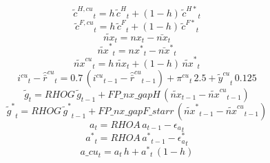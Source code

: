 \begin{dmath}
{{\tilde c^{H,cu}}}_{t}={{h}}\, {{\tilde c^H}}_{t}+\left(1-{{h}}\right)\, {{\tilde c^{H*}}}_{t}
\end{dmath}
\begin{dmath}
{{\tilde c^{F,cu}}}_{t}={{h}}\, {{\tilde c^F}}_{t}+\left(1-{{h}}\right)\, {{\tilde c^{F*}}}_{t}
\end{dmath}
\begin{dmath}
{{\tilde{nx}}}_{t}={{nx}}_{t}-{{\bar{nx}}}_{t}
\end{dmath}
\begin{dmath}
{{\tilde{nx}^*}}_{t}={{nx^*}}_{t}-{{\bar{nx}^*}}_{t}
\end{dmath}
\begin{dmath}
{{\tilde{nx}^{cu}}}_{t}={{h}}\, {{\tilde{nx}}}_{t}+\left(1-{{h}}\right)\, {{\tilde{nx}^*}}_{t}
\end{dmath}
\begin{dmath}
{{i^{cu}}}_{t}-{{\hat {\bar r}^{cu}}}_{t}=0.7\, \left({{i^{cu}}}_{t-1}-{{\hat {\bar r}^{cu}}}_{t-1}\right)+{{\pi^{cu}}}_{t}\, 2.5+{{\tilde y^{cu}}}_{t}\, 0.125
\end{dmath}
\begin{dmath}
{{\tilde g}}_{t}={RHOG}\, {{\tilde g}}_{t-1}+{FP\_nx\_gapH}\, \left({{\tilde{nx}}}_{t-1}-{{\tilde{nx}^{cu}}}_{t-1}\right)
\end{dmath}
\begin{dmath}
{{\tilde g^*}}_{t}={RHOG}\, {{\tilde g^*}}_{t-1}+{FP\_nx\_gapF\_starr}\, \left({{\tilde{nx}^*}}_{t-1}-{{\tilde{nx}^{cu}}}_{t-1}\right)
\end{dmath}
\begin{dmath}
{{a}}_{t}={RHOA}\, {{a}}_{t-1}-{{\epsilon_a}}_{t}
\end{dmath}
\begin{dmath}
{{a^*}}_{t}={RHOA}\, {{a^*}}_{t-1}-{{\epsilon_a^*}}_{t}
\end{dmath}
\begin{dmath}
{a\_cu}_{t}={{a}}_{t}\, {{h}}+{{a^*}}_{t}\, \left(1-{{h}}\right)
\end{dmath}
